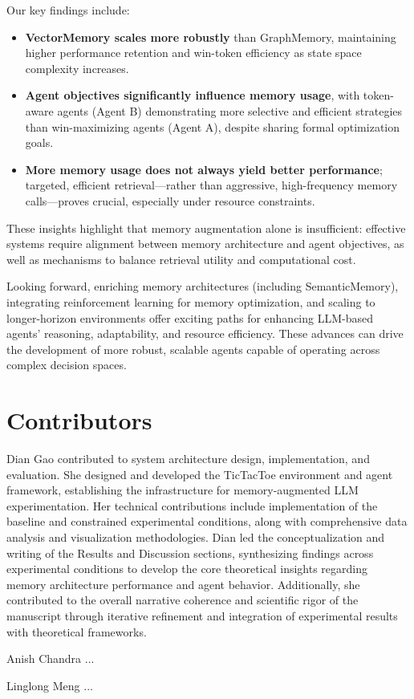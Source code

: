 \documentclass[10pt]{article}
\begin{document}
Our key findings include:

\begin{itemize}[leftmargin=*,nosep]
\item \textbf{VectorMemory scales more robustly} than GraphMemory, maintaining higher performance retention and win-token efficiency as state space complexity increases.
\item \textbf{Agent objectives significantly influence memory usage}, with token-aware agents (Agent B) demonstrating more selective and efficient strategies than win-maximizing agents (Agent A), despite sharing formal optimization goals.
\item \textbf{More memory usage does not always yield better performance}; targeted, efficient retrieval—rather than aggressive, high-frequency memory calls—proves crucial, especially under resource constraints.
\end{itemize}

These insights highlight that memory augmentation alone is insufficient: effective systems require alignment between memory architecture and agent objectives, as well as mechanisms to balance retrieval utility and computational cost.

Looking forward, enriching memory architectures (including SemanticMemory), integrating reinforcement learning for memory optimization, and scaling to longer-horizon environments offer exciting paths for enhancing LLM-based agents' reasoning, adaptability, and resource efficiency. These advances can drive the development of more robust, scalable agents capable of operating across complex decision spaces.

\section{Contributors}
Dian Gao contributed to system architecture design, implementation, and evaluation. She designed and developed the TicTacToe environment and agent framework, establishing the infrastructure for memory-augmented LLM experimentation. Her technical contributions include implementation of the baseline and constrained experimental conditions, along with comprehensive data analysis and visualization methodologies. Dian led the conceptualization and writing of the Results and Discussion sections, synthesizing findings across experimental conditions to develop the core theoretical insights regarding memory architecture performance and agent behavior. Additionally, she contributed to the overall narrative coherence and scientific rigor of the manuscript through iterative refinement and integration of experimental results with theoretical frameworks.

Anish Chandra ...

Linglong Meng ...



\end{document}
